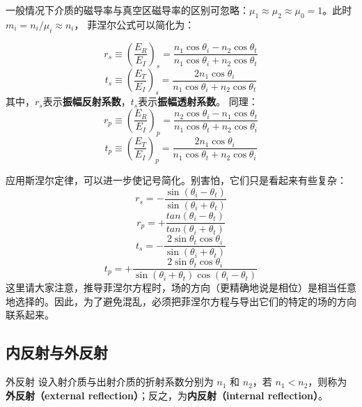 一般情况下介质的磁导率与真空区磁导率的区别可忽略：$\mu_1\approx\mu_2\approx\mu_0=1$。此时$m_i=n_i/\mu_i \approx n_i$， 菲涅尔公式可以简化为：

\begin{equation}\label{eq_Fresnl_3}
r_s \equiv \left(\frac{E_R}{E_I}\right)_s = \frac{n_1\cos{\theta_i} - n_2\cos\theta_t}{n_1\cos\theta_i + n_2\cos\theta_t}
\end{equation}
\begin{equation}\label{eq_Fresnl_4}
t_s \equiv \left(\frac{E_T}{E_I}\right)_s =  \frac{2 n_1\cos\theta_i}{n_1\cos\theta_i + n_2\cos\theta_t}
\end{equation}
其中，$r_s$表示\textbf{振幅反射系数}，$t_s$表示\textbf{振幅透射系数}。
同理：
\begin{equation}\label{eq_Fresnl_5}
r_p \equiv \left(\frac{E_R}{E_I}\right)_p = \frac{n_2\cos{\theta_i} - n_1\cos\theta_t}{n_1\cos\theta_t + n_2\cos\theta_i}
\end{equation}
\begin{equation}\label{eq_Fresnl_6}
t_p \equiv \left(\frac{E_T}{E_I}\right)_p =  \frac{2 n_1\cos\theta_i}{n_1\cos\theta_t + n_2\cos\theta_i}
\end{equation}

应用斯涅尔定律，可以进一步使记号简化。别害怕，它们只是看起来有些复杂：
\begin{equation}\label{eq_Fresnl_7}
r_s = -\frac{\sin(\theta_i - \theta_t)}{\sin(\theta_i + \theta_t)}
\end{equation}
\begin{equation}\label{eq_Fresnl_8}
r_p = +\frac{tan(\theta_i - \theta_t)}{tan(\theta_i + \theta_t)}
\end{equation}
\begin{equation}\label{eq_Fresnl_9}
t_s = -\frac{2\sin\theta_t\cos\theta_i}{\sin(\theta_i + \theta_t)}
\end{equation}
\begin{equation}\label{eq_Fresnl_10}
t_p = +\frac{2\sin\theta_t\cos\theta_i}{\sin(\theta_i + \theta_t)\cos(\theta_i - \theta_t)}
\end{equation}
这里请大家注意，推导菲涅尔方程时，场的方向（更精确地说是相位）是相当任意地选择的。因此，为了避免混乱，必须把菲涅尔方程与导出它们的特定的场的方向联系起来。

\subsection{内反射与外反射}
\begin{definition}{外反射}
设入射介质与出射介质的折射系数分别为 $n_1$ 和 $n_2$，若 $n_1<n_2$，则称为\textbf{外反射（external reflection）}；反之，为\textbf{内反射（internal reflection）}。
\end{definition}

